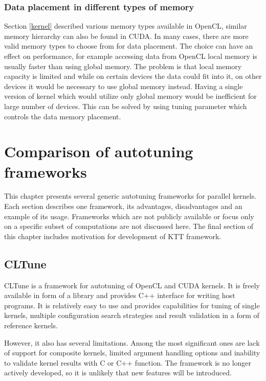 \documentclass
[
    digital, %
    oneside, %
    table, %
    nolof, %
    nolot, %
    nocover %
]{fithesis3}
\begin{document}
\subsection{Data placement in different types of memory}
Section \ref{kernel} described various memory types available in OpenCL, similar memory hierarchy can also be found in CUDA. In many cases, there are
more valid memory types to choose from for data placement. The choice can have an effect on performance, for example accessing data from OpenCL local
memory is usually faster than using global memory. The problem is that local memory capacity is limited and while on certain devices the data could
fit into it, on other devices it would be necessary to use global memory instead. Having a single version of kernel which would utilize only global
memory would be inefficient for large number of devices. This can be solved by using tuning parameter which controls the data memory placement.

\chapter{Comparison of autotuning frameworks}
This chapter presents several generic autotuning frameworks for parallel kernels. Each section describes one framework, its advantages, disadvantages
and an example of its usage. Frameworks which are not publicly available or focus only on a specific subset of computations are not discussed here.
The final section of this chapter includes motivation for development of KTT framework.

\section{CLTune}
CLTune \cite{cltune} is a framework for autotuning of OpenCL and CUDA kernels. It is freely available in form of a library and provides C++ interface
for writing host programs. It is relatively easy to use and provides capabilities for tuning of single kernels, multiple configuration search
strategies and result validation in a form of reference kernels.

However, it also has several limitations. Among the most significant ones are lack of support for composite kernels, limited argument handling
options and inability to validate kernel results with C or C++ function. The framework is no longer actively developed, so it is unlikely that new
features will be introduced.
\end{document}
